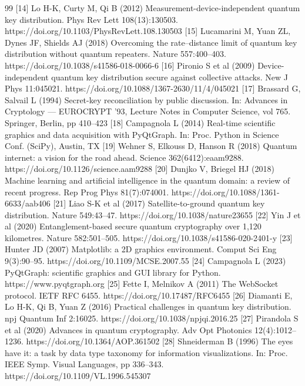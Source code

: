 {{{{{{\begin{thebibliography}{99}
 [14] Lo H-K, Curty M, Qi B (2012) Measurement-device-independent quantum key distribution. Phys Rev Lett 108(13):130503. https://doi.org/10.1103/PhysRevLett.108.130503
 [15] Lucamarini M, Yuan ZL, Dynes JF, Shields AJ (2018) Overcoming the rate–distance limit of quantum key distribution without quantum repeaters. Nature 557:400–403. https://doi.org/10.1038/s41586-018-0066-6
 [16] Pironio S et al (2009) Device-independent quantum key distribution secure against collective attacks. New J Phys 11:045021. https://doi.org/10.1088/1367-2630/11/4/045021
 [17] Brassard G, Salvail L (1994) Secret-key reconciliation by public discussion. In: Advances in Cryptology — EUROCRYPT '93, Lecture Notes in Computer Science, vol 765. Springer, Berlin, pp 410–423
 [18] Campagnola L (2014) Real-time scientific graphics and data acquisition with PyQtGraph. In: Proc. Python in Science Conf. (SciPy), Austin, TX
 [19] Wehner S, Elkouss D, Hanson R (2018) Quantum internet: a vision for the road ahead. Science 362(6412):eaam9288. https://doi.org/10.1126/science.aam9288
 [20] Dunjko V, Briegel HJ (2018) Machine learning and artificial intelligence in the quantum domain: a review of recent progress. Rep Prog Phys 81(7):074001. https://doi.org/10.1088/1361-6633/aab406
 [21] Liao S-K et al (2017) Satellite-to-ground quantum key distribution. Nature 549:43–47. https://doi.org/10.1038/nature23655
 [22] Yin J et al (2020) Entanglement-based secure quantum cryptography over 1,120 kilometres. Nature 582:501–505. https://doi.org/10.1038/s41586-020-2401-y
 [23] Hunter JD (2007) Matplotlib: a 2D graphics environment. Comput Sci Eng 9(3):90–95. https://doi.org/10.1109/MCSE.2007.55
 [24] Campagnola L (2023) PyQtGraph: scientific graphics and GUI library for Python. https://www.pyqtgraph.org
 [25] Fette I, Melnikov A (2011) The WebSocket protocol. IETF RFC 6455. https://doi.org/10.17487/RFC6455
 [26] Diamanti E, Lo H-K, Qi B, Yuan Z (2016) Practical challenges in quantum key distribution. npj Quantum Inf 2:16025. https://doi.org/10.1038/npjqi.2016.25
 [27] Pirandola S et al (2020) Advances in quantum cryptography. Adv Opt Photonics 12(4):1012–1236. https://doi.org/10.1364/AOP.361502
 [28] Shneiderman B (1996) The eyes have it: a task by data type taxonomy for information visualizations. In: Proc. IEEE Symp. Visual Languages, pp 336–343. https://doi.org/10.1109/VL.1996.545307

\end{thebibliography}}}}}}}
